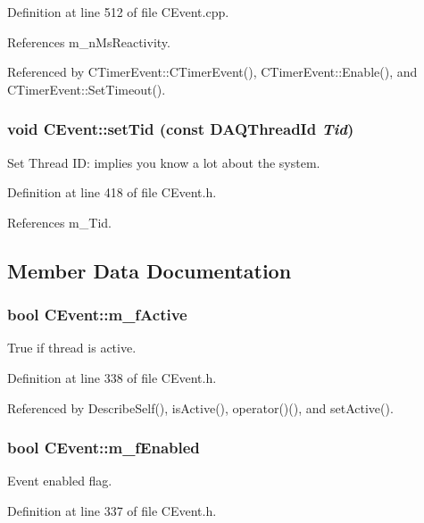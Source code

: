 Definition at line 512 of file CEvent.cpp.

References m\_\-n\-Ms\-Reactivity.

Referenced by CTimer\-Event::CTimer\-Event(), CTimer\-Event::Enable(), and CTimer\-Event::Set\-Timeout().
\subsubsection{\setlength{\rightskip}{0pt plus 5cm}void CEvent::set\-Tid (const DAQThread\-Id {\em Tid})\hspace{0.3cm}{\tt  [inline, protected]}}\label{classCEvent_b1}


Set Thread ID: implies you know a lot about the system.



Definition at line 418 of file CEvent.h.

References m\_\-Tid.

\subsection{Member Data Documentation}
\subsubsection{\setlength{\rightskip}{0pt plus 5cm}bool CEvent::m\_\-f\-Active\hspace{0.3cm}{\tt  [private]}}\label{classCEvent_o1}


True if thread is active.



Definition at line 338 of file CEvent.h.

Referenced by Describe\-Self(), is\-Active(), operator()(), and set\-Active().
\subsubsection{\setlength{\rightskip}{0pt plus 5cm}bool CEvent::m\_\-f\-Enabled\hspace{0.3cm}{\tt  [private]}}\label{classCEvent_o0}


Event enabled flag.



Definition at line 337 of file CEvent.h.

